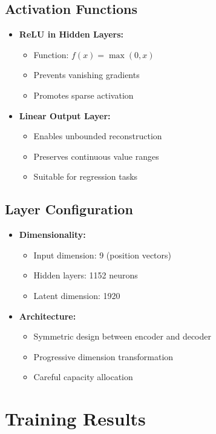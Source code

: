 \documentclass{article}
\begin{document}
\subsection{Activation Functions}
\begin{itemize}
    \item \textbf{ReLU in Hidden Layers:}
    \begin{itemize}
        \item Function: $f(x) = \max(0, x)$
        \item Prevents vanishing gradients
        \item Promotes sparse activation
    \end{itemize}
    \item \textbf{Linear Output Layer:}
    \begin{itemize}
        \item Enables unbounded reconstruction
        \item Preserves continuous value ranges
        \item Suitable for regression tasks
    \end{itemize}
\end{itemize}

\subsection{Layer Configuration}
\begin{itemize}
    \item \textbf{Dimensionality:}
    \begin{itemize}
        \item Input dimension: 9 (position vectors)
        \item Hidden layers: 1152 neurons
        \item Latent dimension: 1920
    \end{itemize}
    \item \textbf{Architecture:}
    \begin{itemize}
        \item Symmetric design between encoder and decoder
        \item Progressive dimension transformation
        \item Careful capacity allocation
    \end{itemize}
\end{itemize}

\section{Training Results}
\end{document}
